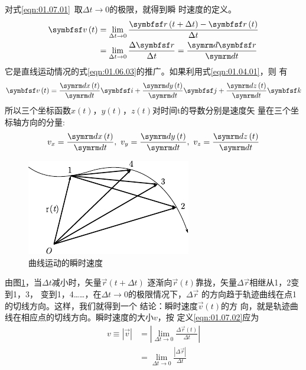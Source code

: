 对式\eqref{eqn:01.07.01}~取$\Delta t \rightarrow 0$的极限，就得到瞬
时速度的定义。
\begin{equation}\label{eqn:01.07.02}
    \begin{aligned}
        \vec{v}\left(t\right) & =\lim _{\Delta t \rightarrow 0} \frac{\vec{r}\left(t+\Delta t\right)-\vec{r}\left(t\right)}{\Delta t} \\
                  & =\lim _{\Delta t \rightarrow 0} \frac{\Delta \vec{r}}{\Delta t} =\frac{\dif\vec{r}}{\dif t}
    \end{aligned}
\end{equation}
它是直线运动情况的式\eqref{eqn:01.06.03}的推广。如果利用式\eqref{eqn:01.04.01}，则
有
\begin{equation}\label{eqn:01.07.03}
    \vec{v}\left(t\right)=\frac{\dif x\left(t\right)}{\dif t} \vec{i}+\frac{\dif y\left(t\right)}{\dif t} \vec{j}+\frac{\dif z\left(t\right)}{\dif t} \vec{k}
\end{equation}
所以三个坐标函数$x\left(t\right)$，$y\left(t\right)$，$z\left(t\right)$对时间t的导数分别是速度矢
量在三个坐标轴方向的分量:
\begin{equation}\label{eqn:01.07.04}
    v_{x}=\frac{\dif x\left(t\right)}{\dif t}, ~ v_{y}=\frac{\dif y\left(t\right)}{\dif t}, ~ v_{z}=\frac{\dif z\left(t\right)}{\dif t}
\end{equation}
\clearpage
\begin{figure}
    \centering
    \small
    \includegraphics{figure/fig01.12}
    \caption{曲线运动的瞬时速度}
    \label{fig:01.12}
\end{figure}
由图\ref{fig:01.12}，当$\Delta t$减小时，矢量$\vec{r}\left(t+\Delta t\right)$
逐渐向$\vec{r}\left(t\right)$靠拢，矢量$\Delta \vec{r}$相继从1，2变到1，3，
变到1，4……，在$\Delta t \rightarrow 0$的极限情况下，$\Delta \vec{r}$
的方向趋于轨迹曲线在点1的切线方向。这样，我们就得到一个
结论：瞬时速度$\vec{v}\left(t\right)$的方
向，就是轨迹曲线在相应点的切线方向。瞬时速度的大小$v$，按
定义\eqref{eqn:01.07.02}应为
\setlength{\mathindent}{15em}
\begin{equation*}
    \begin{aligned}
        v\equiv |\vec{v}| & =\left|\lim _{\Delta t \rightarrow 0} \frac{\Delta \vec{r}\left(t\right)}{\Delta t}\right| \\
                         & =\lim _{\Delta t \rightarrow 0} \frac{|\Delta \vec{r}|}{\Delta t}
    \end{aligned}
\end{equation*}

